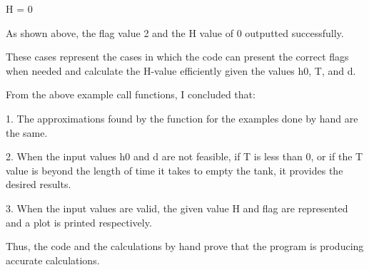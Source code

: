 \documentclass{article}
\begin{document}
{H = 0
\par \medskip \par
As shown above, the flag value 2 and the H value of 0 outputted successfully.
\par \medskip \par
These cases represent the cases in which the code can present the correct flags when needed and calculate the H-value efficiently given the values h0, T, and d.
\par \medskip \par
From the above example call functions, I concluded that:
\par \medskip \par
1.	The approximations found by the function for the examples done by hand are the same.
\par \medskip \par
2.	When the input values h0 and d are not feasible, if T is less than 0, or if the T value is beyond the length of time it takes to empty the tank, it provides the desired results.
\par \medskip \par
3.	When the input values are valid, the given value H and flag are represented and a plot is printed respectively.
\par \medskip \par
Thus, the code and the calculations by hand prove that the program is producing accurate calculations.
} 

\par \medskip



\end{document}
